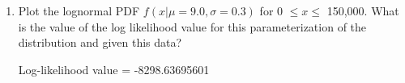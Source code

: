 \documentclass[letterpaper,12pt]{article}
\theoremstyle{definition}
\begin{document}
\begin{enumerate}
\begin{enumerate}
\item Plot the lognormal PDF $f(x|\mu = 9.0, \sigma = 0.3)$ for 0 $\leq x \leq$ 150,000. What is the value of the log likelihood value for this parameterization of the distribution and given this data?
\par
\begin{figure}[H]\centering\captionsetup{width=4.0in}
\end{figure}
\par
Log-likelihood value = -8298.63695601
\par\bigskip


\end{enumerate}
\end{enumerate}
\end{document}
